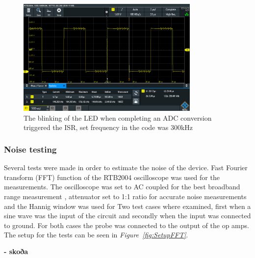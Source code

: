 \begin{figure}[h]
    \centering
    \includegraphics[width=0.8\textwidth]{graphics/STATDMA_300.PNG}
    \caption{The blinking of the LED when completing an ADC conversion triggered the ISR, set frequency in the code was 300kHz}
    \label{fig:PDBADCDMAsp300}
\end{figure}


\clearpage




\subsubsection{Noise testing}


Several tests were made in order to estimate the noise of the device.
Fast Fourier transform (FFT) function of the RTB2004 oscilloscope was used for the measurements.
The oscilloscope was set to AC coupled for the best broadband range measurement%
, attenuator set to 1:1 ratio %
for accurate noise measurements and the Hannig window was used for 
Two test cases where examined, first when a sine wave was the input of the circuit and secondly when the input was connected to ground.
For both cases the probe was connected to the output of the op amps.
The setup for the tests can be seen in \textit{Figure~\ref{fig:SetupFFT}}.

\textbf{%
- skoða} 


